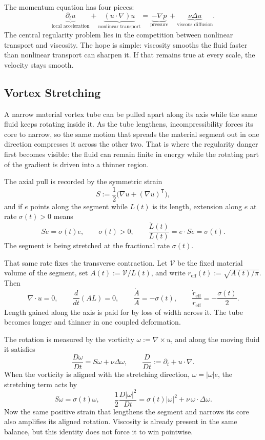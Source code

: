 
The momentum equation has four pieces:
\[
  \underbrace{\partial_t u}_{\text{local acceleration}}
  +
  \underbrace{(u\cdot\nabla)u}_{\text{nonlinear transport}}
  =
  \underbrace{-\nabla p}_{\text{pressure}}
  +
  \underbrace{\nu\Delta u}_{\text{viscous diffusion}}.
\]
The central regularity problem lies in the competition between nonlinear transport and viscosity.
The hope is simple: viscosity smooths the fluid faster than nonlinear transport can sharpen it.
If that remains true at every scale, the velocity stays smooth.

\subsection{Vortex Stretching}\label{sub:ThePerfectlyStretchingVortex}

A narrow material vortex tube can be pulled apart along its axis while the same fluid keeps rotating inside it. As the tube lengthens, incompressibility forces its core to narrow, so the same motion that spreads the material segment out in one direction compresses it across the other two. That is where the regularity danger first becomes visible: the fluid can remain finite in energy while the rotating part of the gradient is driven into a thinner region.

The axial pull is recorded by the symmetric strain
\[
  S:=\frac12\bigl(\nabla u+(\nabla u)^{\mathsf T}\bigr),
\]
and if \(e\) points along the segment while \(L(t)\) is its length, extension along \(e\) at rate \(\sigma(t)>0\) means
\[
  Se=\sigma(t)e,
  \qquad
  \sigma(t)>0,
  \qquad
  \frac{\dot L(t)}{L(t)}
  =
  e\cdot Se
  =
  \sigma(t).
\]
The segment is being stretched at the fractional rate \(\sigma(t)\).

That same rate fixes the transverse contraction. Let \(\mathcal V\) be the fixed material volume of the segment, set \(A(t):=\mathcal V/L(t)\), and write \(r_{\mathrm{eff}}(t):=\sqrt{A(t)/\pi}\). Then
\[
  \nabla\cdot u=0,
  \qquad
  \frac{d}{dt}(A L)=0,
  \qquad
  \frac{\dot A}{A}=-\sigma(t),
  \qquad
  \frac{\dot r_{\mathrm{eff}}}{r_{\mathrm{eff}}}
  =
  -\frac{\sigma(t)}{2}.
\]
Length gained along the axis is paid for by loss of width across it. The tube becomes longer and thinner in one coupled deformation.

The rotation is measured by the vorticity \(\omega:=\nabla\times u\), and along the moving fluid it satisfies
\[
  \frac{D\omega}{Dt}
  =
  S\omega+\nu\Delta\omega,
  \qquad
  \frac{D}{Dt}
  :=
  \partial_t+u\cdot\nabla.
\]
When the vorticity is aligned with the stretching direction, \(\omega=|\omega|e\), the stretching term acts by
\[
  S\omega
  =
  \sigma(t)\omega,
  \qquad
  \frac12\frac{D|\omega|^2}{Dt}
  =
  \sigma(t)|\omega|^2
  +
  \nu\,\omega\cdot\Delta\omega.
\]
Now the same positive strain that lengthens the segment and narrows its core also amplifies its aligned rotation. Viscosity is already present in the same balance, but this identity does not force it to win pointwise.

